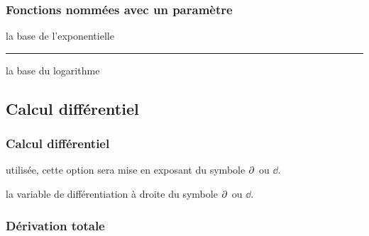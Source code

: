 \documentclass[12pt,a4paper]{article}
\theoremstyle{definition}
\newcommand\separation{
	\medskip
	\hfill\rule{0.5\textwidth}{0.75pt}\hfill
	\medskip
}
\begin{document}





\subsubsection{Fonctions nommées avec un paramètre}



\IDarg{} la base de l'exponentielle

\separation


\IDarg{} la base du logarithme



\subsection{Calcul différentiel}

\subsubsection{Calcul différentiel}



\IDoption{} utilisée, cette option sera mise en exposant du symbole $\pp{}$ ou $\dd{}$.

\IDarg{} la variable de différentiation à droite du symbole $\pp{}$ ou $\dd{}$.





\subsubsection{Dérivation totale}

\end{document}
